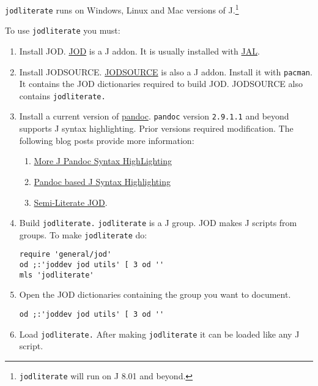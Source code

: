 \texttt{jodliterate} runs on Windows, Linux and Mac versions of
J.\footnote{\texttt{jodliterate} will run on J 8.01 and beyond.}

To use \texttt{jodliterate} you must:

\begin{enumerate}[1.]
\item
  Install JOD.
  \href{http://www.jsoftware.com/jwiki/Addons/general/jod}{JOD} is a J
  addon. It is usually installed with
  \href{http://www.jsoftware.com/jwiki/JAL}{JAL}.
\item
  Install JODSOURCE.
  \href{http://www.jsoftware.com/jwiki/Addons/general/jodsource}{JODSOURCE}
  is also a J addon. Install it with \texttt{pacman}. It contains the JOD
  dictionaries required to build JOD. JODSOURCE also contains
  \texttt{jodliterate.}
\item
  Install a current version of \href{https://pandoc.org/}{pandoc}.
  \texttt{pandoc} version \texttt{2.9.1.1} and beyond 
  supports J syntax highlighting. Prior versions required modification. The
  following blog posts provide more information:
      \begin{enumerate}
	  \item \href{https://analyzethedatanotthedrivel.org/2020/02/19/more-j-pandoc-syntax-highlighting/}{More J Pandoc Syntax HighLighting}
	  \item \href{https://analyzethedatanotthedrivel.org/2012/09/20/pandoc-based-j-syntax-highlighting/}{Pandoc based J Syntax Highlighting}
	  \item \href{https://analyzethedatanotthedrivel.org/2012/10/01/semi-literate-jod/}{Semi-Literate JOD}.
	  \end{enumerate}
\item
  Build \texttt{jodliterate.} \texttt{jodliterate} is a J group. JOD
  makes J scripts from groups. To make \texttt{jodliterate} do:

\begin{verbatim}
require 'general/jod'
od ;:'joddev jod utils' [ 3 od ''
mls 'jodliterate'
\end{verbatim}
\item
  Open the JOD dictionaries containing the group you want to document.

\begin{verbatim}
od ;:'joddev jod utils' [ 3 od ''
\end{verbatim}
\item
  Load \texttt{jodliterate.} After making \texttt{jodliterate} it can be
  loaded like any J script.


\end{enumerate}
